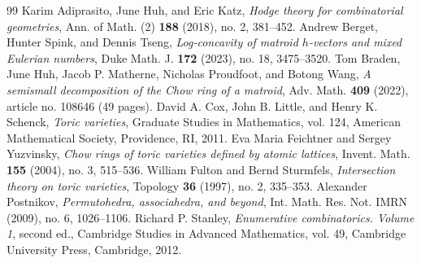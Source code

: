 \documentclass[10pt,a4paper]{amsart}
\numberwithin{equation}{section}
\numberwithin{figure}{section}
\theoremstyle{definition}
\theoremstyle{remark}
\begin{document}
\begin{thebibliography}{99}
 Karim Adiprasito, June Huh, and Eric Katz, \emph{Hodge theory for combinatorial geometries}, Ann. of Math. (2) \textbf{188} (2018), no. 2, 381--452.
 Andrew Berget, Hunter Spink, and Dennis Tseng, \emph{Log-concavity of matroid $h$-vectors and mixed Eulerian numbers}, Duke Math. J. \textbf{172} (2023), no. 18, 3475--3520.
 Tom Braden, June Huh, Jacob P. Matherne, Nicholas Proudfoot, and Botong Wang, \emph{A semismall decomposition of the Chow ring of a matroid}, Adv. Math. \textbf{409} (2022), article no. 108646 (49 pages).
 David A. Cox, John B. Little, and Henry K. Schenck, \emph{Toric varieties}, Graduate Studies in Mathematics, vol. 124, American Mathematical Society, Providence, RI, 2011.
 Eva Maria Feichtner and Sergey Yuzvinsky, \emph{Chow rings of toric varieties defined by atomic lattices}, Invent. Math. \textbf{155} (2004), no. 3, 515--536.
 William Fulton and Bernd Sturmfels, \emph{Intersection theory on toric varieties}, Topology \textbf{36} (1997), no. 2, 335--353.
 Alexander Postnikov, \emph{Permutohedra, associahedra, and beyond}, Int. Math. Res. Not. IMRN (2009), no. 6, 1026--1106.
 Richard P. Stanley, \emph{Enumerative combinatorics. Volume 1}, second ed., Cambridge Studies in Advanced Mathematics, vol. 49, Cambridge University Press, Cambridge, 2012.
\end{thebibliography}
\end{document}

